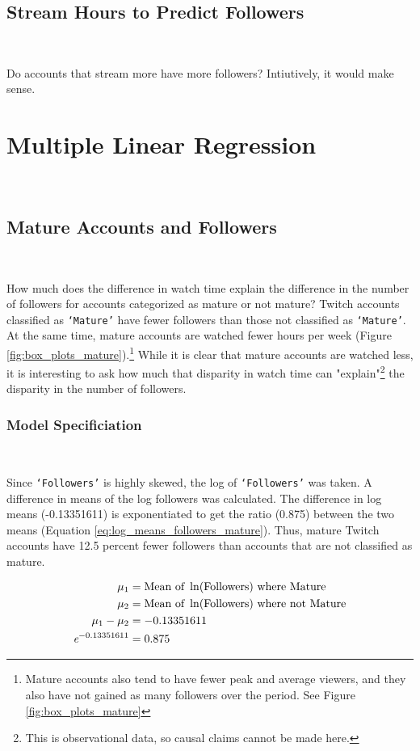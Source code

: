 \documentclass[12pt]{article}
\begin{document}
\subsection{Stream Hours to Predict Followers}\

Do accounts that stream more have more followers? Intiutively, it would make sense.
\section{Multiple Linear Regression}\

\subsection{Mature Accounts and Followers}\

How much does the difference in watch time explain the difference in the number of followers for accounts categorized as mature or not mature? Twitch accounts classified as \texttt{`Mature'} have fewer followers than those not classified as \texttt{`Mature'}. At the same time, mature accounts are watched fewer hours per week (Figure \ref{fig:box_plots_mature}).\footnote{Mature accounts also tend to have fewer peak and average viewers, and they also have not gained as many followers over the period. See Figure \ref{fig:box_plots_mature}} While it is clear that mature accounts are watched less, it is interesting to ask how much that disparity in watch time can "explain"\footnote{This is observational data, so causal claims cannot be made here.} the disparity in the number of followers.

\subsubsection{Model Specificiation}\

Since \texttt{`Followers'} is highly skewed, the log of \texttt{`Followers'} was taken. A difference in means of the log followers was calculated. The difference in log means (-0.13351611) is exponentiated to get the ratio (0.875) between the two means (Equation \ref{eq:log_means_followers_mature}). Thus, mature Twitch accounts have 12.5 percent fewer followers than accounts that are not classified as mature.

\begin{equation}
\begin{aligned}
\mu_{1} & = \text{Mean of } \ln(\text{Followers}) \text{ where Mature} \\
\mu_{2} & = \text{Mean of } \ln(\text{Followers}) \text{ where not Mature} \\
\mu_{1} - \mu_{2} & = -0.13351611 \\
\emph{e}^{-0.13351611} & = 0.875
\end{aligned}
\label{eq:log_means_followers_mature}
\end{equation}
\end{document}
